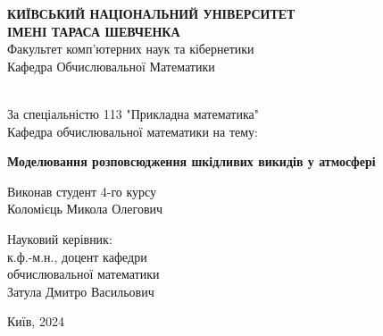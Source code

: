 \begin{titlepage}
    \begin{center}
        \large \textbf{КИЇВСЬКИЙ НАЦІОНАЛЬНИЙ УНІВЕРСИТЕТ \\
            ІМЕНІ ТАРАСА ШЕВЧЕНКА} \\

        \vspace{0.5cm}
        Факультет комп’ютерних наук та кібернетики \\
        Кафедра Обчислювальної Математики
        \vspace{2.5cm}
        \vfill

        \\[2mm]

        За спеціальністю 113 "Прикладна математика" \\
        Кафедра обчислювальної математики
        на тему:

        \vfill

        {\LARGE \textbf{Моделювання розповсюдження шкідливих викидів у атмосфері}}
        \bigskip
        \vspace{6cm}

    \end{center}
    \vfill

    \newlength{\ML}
    \settowidth{\ML}{}
    \begin{minipage}{0.5\textwidth}
        Виконав студент 4-го курсу \\
        Коломієць Микола Олегович
    \end{minipage}%
    \bigskip

    \begin{minipage}{0.5\textwidth}
        Науковий керівник:\\
        к.ф.-м.н., доцент кафедри \\
        обчислювальної математики \\
        Затула Дмитро Васильович
    \end{minipage}%
    \vfill

    \vspace{2cm}

    \begin{center}
        Київ, 2024
    \end{center}

\end{titlepage}

